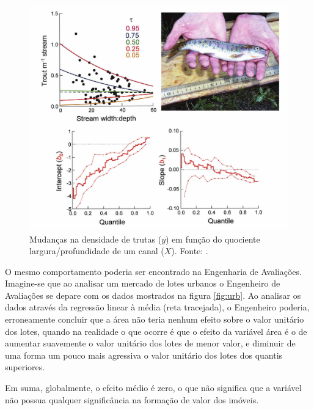 \documentclass[a4paper, 12pt]{article}
\begin{document}
\begin{figure}[H]

{\centering \includegraphics[width=1\linewidth]{images/-000} 

}

\caption{Mudanças na densidade de trutas ($y$) em função do quociente largura/profundidade de um canal ($X$). Fonte: \textcite[413]{QReco}.}\label{fig:trutas}
\end{figure}

O mesmo comportamento poderia ser encontrado na Engenharia de
Avaliações. Imagine-se que ao analisar um mercado de lotes urbanos o
Engenheiro de Avaliações se depare com os dados mostrados na figura
\ref{fig:urb}. Ao analisar os dados através da regressão linear à média
(reta tracejada), o Engenheiro poderia, erroneamente concluir que a área
não teria nenhum efeito sobre o valor unitário dos lotes, quando na
realidade o que ocorre é que o efeito da variável área é o de aumentar
suavemente o valor unitário dos lotes de menor valor, e diminuir de uma
forma um pouco mais agressiva o valor unitário dos lotes dos quantis
superiores.

Em suma, globalmente, o efeito médio é zero, o que não significa que a
variável não possua qualquer significância na formação de valor dos
imóveis.
\end{document}
